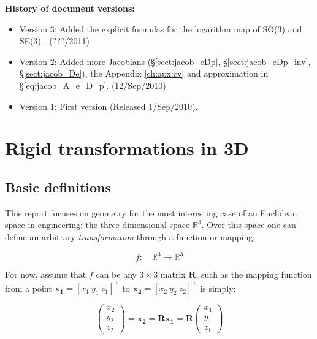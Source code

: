\documentclass[a4paper,11pt]{report}
\begin{document}
\newpage


\textbf{History of document versions:}
\begin{itemize}
 \item Version 3: Added the explicit formulas for the logarithm map of SO(3) and SE(3)
   . (???/2011)

 \item Version 2: Added more Jacobians (\S\ref{sect:jacob_eDp},
\S\ref{sect:jacob_eDp_inv}, \S\ref{sect:jacob_De}), 
         the Appendix \ref{ch:apx:cv} and approximation in \S\ref{eq:jacob_A_e_D_p}.
(12/Sep/2010)

 \item Version 1: First version (Released 1/Sep/2010).
\end{itemize}


\newpage

\tableofcontents


\chapter{Rigid transformations in 3D}


\section{Basic definitions}
\label{sect:basic}

This report focuses on geometry for the most interesting case of an Euclidean space in 
engineering: the three-dimensional space $\mathbb{R}^3$. 
Over this space one can define an arbitrary \emph{transformation} through 
a function or mapping:

\begin{equation}
 f: \quad \mathbb{R}^3 \rightarrow \mathbb{R}^3
\end{equation}

For now, assume that $f$ can be any $3 \times 3$ matrix $\mathbf{R}$, 
such as the mapping function 
from a point $\mathbf{x_1}=[x_1 ~ y_1 ~ z_1]^\top$ to $\mathbf{x_2}=[x_2 ~ y_2 ~ z_2]^\top$ is simply:

\begin{equation}
\left(
\begin{array}{c}
 x_2 \\ y_2 \\ z_2
\end{array}
\right)
=
 \mathbf{x_2} 
= 
\mathbf{R} \mathbf{x_1}
=
\mathbf{R} 
\left(
\begin{array}{c}
 x_1 \\ y_1 \\ z_1
\end{array}
\right)
\end{equation}
\end{document}
